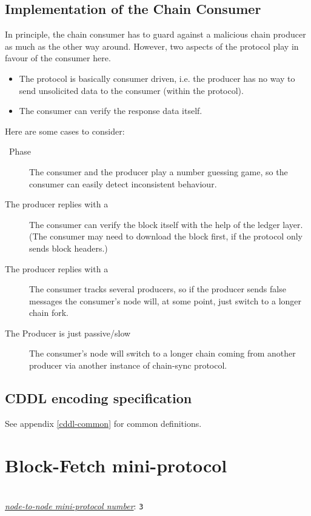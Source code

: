 \subsection{Implementation of the Chain Consumer}
In principle, the chain consumer has to guard against a malicious chain producer
as much as the other way around.
However, two aspects of the protocol play in favour of the consumer here.
\begin{itemize}
  \item The protocol is basically consumer driven, i.e. the producer has no way to send unsolicited
data to the consumer (within the protocol).
  \item The consumer can verify the response data itself.
\end{itemize}
Here are some cases to consider:
\begin{description}
\item[\MsgFindIntersect~Phase]
  The consumer and the producer play a number guessing game, so the consumer can easily detect
  inconsistent behaviour.
\item[The producer replies with a \MsgRollForward] The consumer can verify the block itself
  with the help of the ledger layer.
  (The consumer may need to download the block first, if the protocol only sends block headers.)
\item[The producer replies with a \MsgRollBackward] The consumer tracks several producers, so
  if the producer sends false \MsgRollBackward{} messages the consumer's node
  will, at some point, just switch to a longer chain fork.
\item[The Producer is just passive/slow] The consumer's node will switch to
  a longer chain coming from another producer via another instance of
    chain-sync protocol.
\end{description}

\subsection{CDDL encoding specification}

See appendix \ref{cddl-common} for common definitions.

\section{Block-Fetch mini-protocol}
\label{block-fetch-protocol}
\\
\hyperref[table:node-to-node-protocol-numbers]{\textit{node-to-node mini-protocol number}}: \texttt{3}\\

